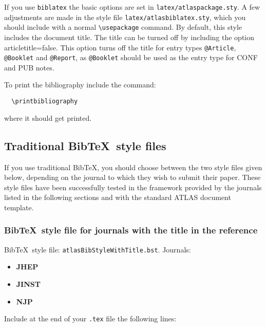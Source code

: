 \documentclass[UKenglish,texlive=2013]{latex/atlasdoc}
\newcommand*{\BibTeX}{Bib\TeX}
\newcommand{\File}[1]{\texttt{#1}\xspace}
\newcommand{\Macro}[1]{\texttt{\textbackslash #1}\xspace}
\newcommand{\Option}[1]{\textsf{#1}\xspace}
\newcommand{\Package}[1]{\texttt{#1}\xspace}
\begin{document}
If you use \Package{biblatex} the basic options are set in \Package{latex/atlaspackage.sty}.
A few adjustments are made in the style file \Package{latex/atlasbiblatex.sty},
which you should include with a normal \Macro{usepackage} command.
By default, this style includes the document title.
The title can be turned off by including the option \Option{articletitle=false}.
This option turns off the title for entry types \texttt{@Article}, \texttt{@Booklet} and \texttt{@Report},
as \texttt{@Booklet} should be used as the entry type for CONF and PUB notes.

To print the bibliography include the command:
%
\begin{verbatim}
  \printbibliography
\end{verbatim}
%
where it should get printed.


\subsection{Traditional \BibTeX\ style files}

If you use traditional \BibTeX, you should choose between the two style files given below, 
depending on the journal to which they wish to submit their paper.
These style files have been successfully tested in the framework provided by 
the journals listed in the following sections and with the standard ATLAS document template.


\subsubsection{\BibTeX\ style file for journals with the title in the reference}

\BibTeX\ style file: \Package{atlasBibStyleWithTitle.bst}.
Journals:
\begin{itemize}\setlength{\parskip}{0pt}\setlength{\itemsep}{0pt}
\item \textbf{JHEP}
\item \textbf{JINST}
\item \textbf{NJP}
\end{itemize}
\noindent Include at the end of your \File{.tex} file the following lines:
\begin{verbatim}


\end{verbatim}
\end{document}
